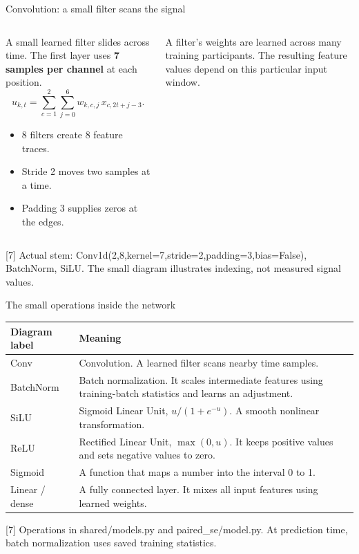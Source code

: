 \documentclass[aspectratio=169,11pt]{beamer}
\newcommand{\source}[1]{\vfill\par{\fontsize{7}{8}\selectfont\color{Muted}#1}}
\newcommand{\smalltable}{\fontsize{9}{11}\selectfont\renewcommand{\arraystretch}{1.18}}
\begin{document}
\begin{frame}{Convolution: a small filter scans the signal}
\begin{columns}[T]
\begin{column}{.53\textwidth}
A small learned filter slides across time. The first layer uses \textbf{7 samples per channel} at each position.
\[u_{k,t}=\sum_{c=1}^{2}\sum_{j=0}^{6}w_{k,c,j}\,x_{c,2t+j-3}.\]
\begin{itemize}\setlength\itemsep{2mm}
\item 8 filters create 8 feature traces.
\item Stride 2 moves two samples at a time.
\item Padding 3 supplies zeros at the edges.
\end{itemize}
\end{column}
\begin{column}{.43\textwidth}
\par
\vspace{4mm}
\small A filter's weights are learned across many training participants. The resulting feature values depend on this particular input window.
\end{column}
\end{columns}
\source{[7] Actual stem: Conv1d(2,8,kernel=7,stride=2,padding=3,bias=False), BatchNorm, SiLU. The small diagram illustrates indexing, not measured signal values.}
\end{frame}

\begin{frame}{The small operations inside the network}
\smalltable
\begin{tabular}{P{3.2cm}P{9.6cm}}\toprule
Diagram label & Meaning\\\midrule
Conv & Convolution. A learned filter scans nearby time samples.\\[2mm]
BatchNorm & Batch normalization. It scales intermediate features using training-batch statistics and learns an adjustment.\\[2mm]
SiLU & Sigmoid Linear Unit, $u/(1+e^{-u})$. A smooth nonlinear transformation.\\[2mm]
ReLU & Rectified Linear Unit, $\max(0,u)$. It keeps positive values and sets negative values to zero.\\[2mm]
Sigmoid & A function that maps a number into the interval 0 to 1.\\[2mm]
Linear / dense & A fully connected layer. It mixes all input features using learned weights.\\\bottomrule
\end{tabular}
\source{[7] Operations in shared/models.py and paired\_se/model.py. At prediction time, batch normalization uses saved training statistics.}
\end{frame}
\end{document}
